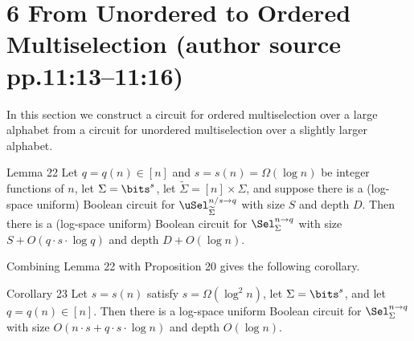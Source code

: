 \section*{6 From Unordered to Ordered Multiselection (author source pp.11:13--11:16)}
In this section we construct a circuit for ordered multiselection over a large alphabet from a circuit for unordered multiselection over a slightly larger alphabet.
\begin{originalresult}{Lemma 22}
Let $q=q(n)\in[n]$ and $s=s(n)=\Omega(\log n)$ be integer functions of $n$, let $\Sigma=\bits^s$, let $\widetilde\Sigma=[n]\times\Sigma$, and suppose there is a (log-space uniform) Boolean circuit for $\uSel_{\widetilde\Sigma}^{n/s\to q}$ with size $S$ and depth $D$.
Then there is a (log-space uniform) Boolean circuit for $\Sel_\Sigma^{n\to q}$ with size $S+O(q\cdot s\cdot\log q)$ and depth $D+O(\log n)$.
\end{originalresult}
Combining Lemma 22 with Proposition 20 gives the following corollary.
\begin{originalresult}{Corollary 23}
Let $s=s(n)$ satisfy $s=\Omega(\log^2n)$, let $\Sigma=\bits^s$, and let $q=q(n)\in[n]$. Then there is a log-space uniform Boolean circuit for $\Sel_\Sigma^{n\to q}$ with size $O(n\cdot s+q\cdot s\cdot\log n)$ and depth $O(\log n)$.
\end{originalresult}
